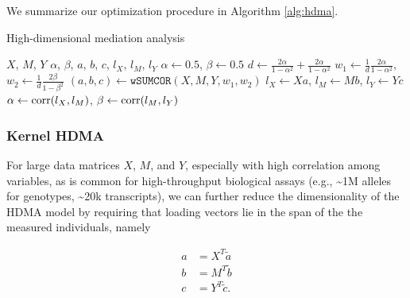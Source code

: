 \documentclass[
]{article}
\begin{document}
We summarize our optimization procedure in Algorithm \ref{alg:hdma}.

\begin{algorithm}
\caption{High-dimensional mediation analysis}\label{alg:hdma}
\begin{algorithmic}
\Require $X$, $M$, $Y$ 
\Ensure $\alpha$, $\beta$, $a$, $b$, $c$, $l_X$, $l_M$, $l_Y$ 
\State $\alpha \gets 0.5$, $\beta \gets 0.5$ 
\State $d \gets \frac{2\alpha}{1-\alpha^2} + \frac{2\alpha}{1-\alpha^2}$ 
\State $w_1 \gets \frac{1}{d}\frac{2\alpha}{1-\alpha^2}$, $w_2 \gets \frac{1}{d}\frac{2\beta}{1-\beta^2}$ 
\State $(a,b,c) \gets \texttt{wSUMCOR}(X, M, Y, w_1, w_2)$  
\State $l_X \gets Xa$, $l_M \gets Mb$, $l_Y \gets Yc$ 
\State $\alpha \gets {\rm corr}(l_X, l_M)$, $\beta \gets {\rm corr}(l_M, l_Y)$ 
\EndWhile
\end{algorithmic}
\end{algorithm}

\subsubsection{Kernel HDMA}\label{kernel-hdma}

For large data matrices \(X\), \(M\), and \(Y\), especially with high
correlation among variables, as is common for high-throughput biological
assays (e.g., \textasciitilde1M alleles for genotypes,
\textasciitilde20k transcripts), we can further reduce the
dimensionality of the HDMA model by requiring that loading vectors lie
in the span of the the measured individuals, namely

\begin{align}
a &= X^T \tilde{a} \\
b &= M^T \tilde{b} \\
c &= Y^T \tilde{c}.
\end{align}
\end{document}
